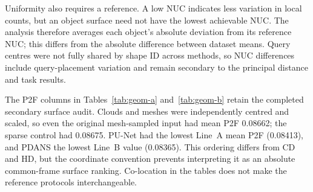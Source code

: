 
Uniformity also requires a reference. A low NUC indicates less variation in
local counts, but an object surface need not have the lowest achievable
NUC. The analysis therefore averages each object's absolute deviation from
its reference NUC; this differs from the absolute difference between dataset
means. Query centres were not fully shared by shape ID across methods,
so NUC differences include query-placement variation and remain secondary
to the principal distance and task results.

The P2F columns in Tables~\ref{tab:geom-a} and~\ref{tab:geom-b}
retain the completed secondary surface audit. Clouds and meshes were
independently centred and scaled, so even the original mesh-sampled
input had mean P2F 0.08662; the sparse control had 0.08675.
PU-Net had the lowest Line~A mean P2F (0.08413), and PDANS the lowest
Line~B value (0.08365). This ordering differs from CD and HD, but the
coordinate convention prevents interpreting it as an absolute
common-frame surface ranking. Co-location in the tables does not
make the reference protocols interchangeable.



\FloatBarrier

